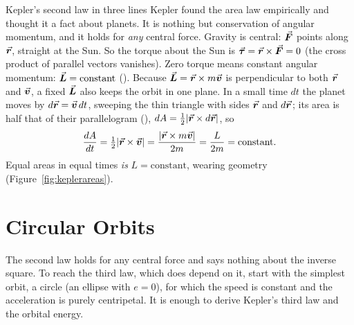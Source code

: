 \begin{derivbox}{Kepler's second law in three lines}
Kepler found the area law empirically and thought it a fact about planets. It is nothing but conservation
of angular momentum, and it holds for \emph{any} central force.
 Gravity is central: $\vec{\bm{F}}$ points along $\vec{\bm{r}}$, straight at the Sun. So the torque about the Sun
is $\vec{\bm{\tau}}=\vec{\bm{r}}\times\vec{\bm{F}}=0$ (the cross product of parallel vectors vanishes).
 Zero torque means constant angular momentum: $\vec{\bm{L}}=\text{constant}$ ().
Because $\vec{\bm{L}}=\vec{\bm{r}}\times m\vec{\bm{v}}$ is perpendicular to both $\vec{\bm{r}}$ and $\vec{\bm{v}}$, a fixed $\vec{\bm{L}}$ also keeps the orbit
in one plane.
 In a small time $dt$ the planet moves by $d\vec{\bm{r}}=\vec{\bm{v}}\,dt$, sweeping the thin triangle with sides $\vec{\bm{r}}$
and $d\vec{\bm{r}}$; its area is half that of their parallelogram (), $dA=\tfrac12|\vec{\bm{r}}\times d\vec{\bm{r}}|$, so
\[
\frac{dA}{dt}=\tfrac12|\vec{\bm{r}}\times\vec{\bm{v}}|=\frac{|\vec{\bm{r}}\times m\vec{\bm{v}}|}{2m}=\frac{L}{2m}=\text{constant}.
\]
Equal areas in equal times \emph{is} $L=\text{constant}$, wearing geometry (Figure~\ref{fig:keplerareas}).
\end{derivbox}

\begin{figure}[htbp]
\centering
{}
\end{figure}

\section{Circular Orbits}

The second law holds for any central force and says nothing about the inverse square. To reach the
third law, which does depend on it, start with the simplest orbit, a circle (an ellipse with $e=0$),
for which the speed is constant and the acceleration is purely centripetal. It is enough to derive
Kepler's third law and the orbital energy.

